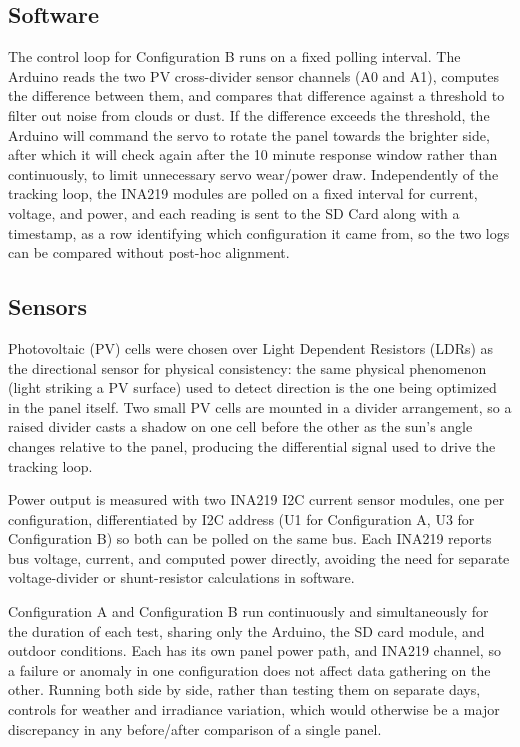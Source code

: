 \documentclass[journal]{IEEEtran}
\begin{document}
\subsection{Software}

The control loop for Configuration B runs on a fixed polling interval. The Arduino
reads the two PV cross-divider sensor channels (A0 and A1), computes the difference
between them, and compares that difference against a threshold to filter out noise from
clouds or dust. If the difference exceeds the threshold, the Arduino will command the
servo to rotate the panel towards the brighter side, after which it will check again
after the 10 minute response window rather than continuously, to limit unnecessary
servo wear/power draw. Independently of the tracking loop, the INA219 modules are
polled on a fixed interval for current, voltage, and power, and each reading is sent to
the SD Card along with a timestamp, as a row identifying which configuration it came
from, so the two logs can be compared without post-hoc alignment.

\subsection{Sensors}

Photovoltaic (PV) cells were chosen over Light Dependent Resistors (LDRs) as the
directional sensor for physical consistency: the same physical phenomenon (light
striking a PV surface) used to detect direction is the one being optimized in the panel
itself. Two small PV cells are mounted in a divider arrangement, so a raised divider
casts a shadow on one cell before the other as the sun's angle changes relative to the
panel, producing the differential signal used to drive the tracking loop.

Power output is measured with two INA219 I2C current sensor modules, one per
configuration, differentiated by I2C address (U1 for Configuration A, U3 for
Configuration B) so both can be polled on the same bus. Each INA219 reports bus
voltage, current, and computed power directly, avoiding the need for separate
voltage-divider or shunt-resistor calculations in software.

Configuration A and Configuration B run continuously and simultaneously for the
duration of each test, sharing only the Arduino, the SD card module, and outdoor
conditions. Each has its own panel power path, and INA219 channel, so a failure or
anomaly in one configuration does not affect data gathering on the other. Running both
side by side, rather than testing them on separate days, controls for weather and
irradiance variation, which would otherwise be a major discrepancy in any
before/after comparison of a single panel.
\end{document}
